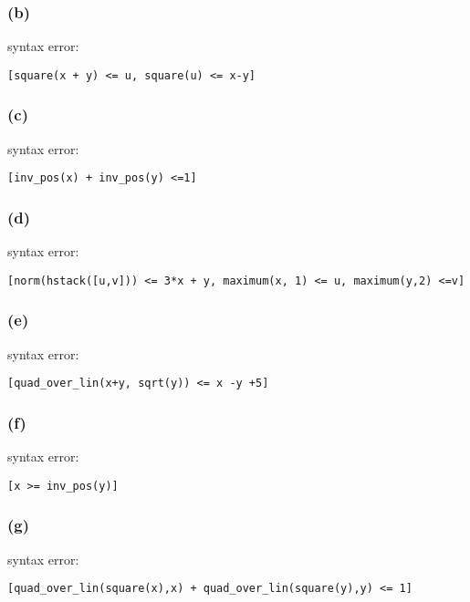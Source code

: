 \documentclass{article}
\begin{document}
\subsubsection*{(b)}
syntax error:
\begin{verbatim}
[square(x + y) <= u, square(u) <= x-y]
\end{verbatim}

\subsubsection*{(c)}
syntax error:
\begin{verbatim}
[inv_pos(x) + inv_pos(y) <=1]
\end{verbatim}
\subsubsection*{(d)}
syntax error:
\begin{verbatim}
[norm(hstack([u,v])) <= 3*x + y, maximum(x, 1) <= u, maximum(y,2) <=v]\end{verbatim}
\subsubsection*{(e)}
syntax error:
\begin{verbatim}
[quad_over_lin(x+y, sqrt(y)) <= x -y +5]
\end{verbatim}
\subsubsection*{(f)}
syntax error:
\begin{verbatim}
[x >= inv_pos(y)]
\end{verbatim}
\subsubsection*{(g)}
syntax error:
\begin{verbatim}
[quad_over_lin(square(x),x) + quad_over_lin(square(y),y) <= 1]
\end{verbatim}
\end{document}
